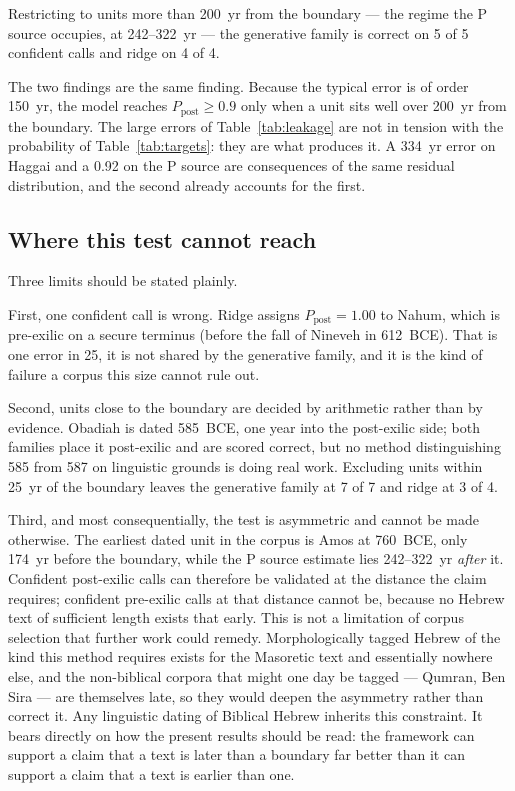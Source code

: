 Restricting to units more than 200~yr from the boundary --- the regime the
P source occupies, at 242--322~yr --- the generative family is correct on 5
of 5 confident calls and ridge on 4 of 4.

The two findings are the same finding.  Because the typical error is of
order 150~yr, the model reaches $P_{\text{post}} \geq 0.9$ only when a unit
sits well over 200~yr from the boundary.  The large errors of
Table~\ref{tab:leakage} are not in tension with the probability of
Table~\ref{tab:targets}: they are what produces it.  A 334~yr error on
Haggai and a 0.92 on the P source are consequences of the same residual
distribution, and the second already accounts for the first.

\subsection*{Where this test cannot reach}

Three limits should be stated plainly.

First, one confident call is wrong.  Ridge assigns $P_{\text{post}} = 1.00$
to Nahum, which is pre-exilic on a secure terminus (before the fall of
Nineveh in 612~BCE).  That is one error in 25, it is not shared by the
generative family, and it is the kind of failure a corpus this size cannot
rule out.

Second, units close to the boundary are decided by arithmetic rather than by
evidence.  Obadiah is dated 585~BCE, one year into the post-exilic side; both
families place it post-exilic and are scored correct, but no method
distinguishing 585 from 587 on linguistic grounds is doing real work.
Excluding units within 25~yr of the boundary leaves the generative family at
7 of 7 and ridge at 3 of 4.

Third, and most consequentially, the test is asymmetric and cannot be made
otherwise.  The earliest dated unit in the corpus is Amos at 760~BCE, only
174~yr before the boundary, while the P source estimate lies 242--322~yr
\emph{after} it.  Confident post-exilic calls can therefore be validated at
the distance the claim requires; confident pre-exilic calls at that distance
cannot be, because no Hebrew text of sufficient length exists that early.
This is not a limitation of corpus selection that further work could
remedy.  Morphologically tagged Hebrew of the kind this method requires
exists for the Masoretic text and essentially nowhere else, and the
non-biblical corpora that might one day be tagged --- Qumran, Ben Sira ---
are themselves late, so they would deepen the asymmetry rather than correct
it.  Any linguistic dating of Biblical Hebrew inherits this constraint.  It
bears directly on how the present results should be read: the framework can
support a claim that a text is later than a boundary far better than it can
support a claim that a text is earlier than one.
